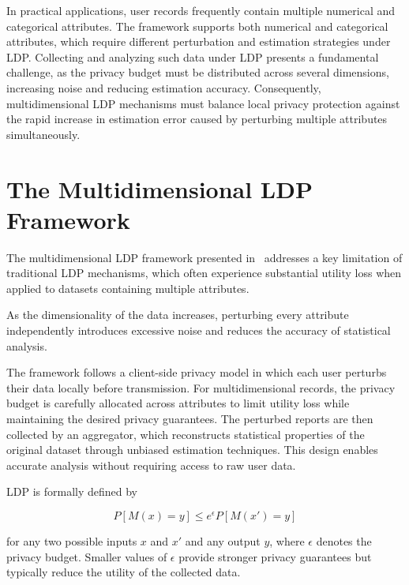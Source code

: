 \documentclass[sigconf]{acmart}
\begin{document}
In practical applications, user records frequently contain multiple numerical and categorical attributes. The framework supports both numerical and categorical attributes, which require different perturbation and estimation strategies under LDP.
 Collecting and analyzing such data under LDP presents a fundamental challenge, as the privacy budget must be distributed across several dimensions, increasing noise and reducing estimation accuracy. Consequently, multidimensional LDP mechanisms must balance local privacy protection against the rapid increase in estimation error caused by perturbing multiple attributes simultaneously.



\section{The Multidimensional LDP Framework}
The multidimensional LDP framework presented in~\cite{wang2019} addresses a key limitation of traditional LDP mechanisms, which often experience substantial utility loss when applied to datasets containing multiple attributes.

 As the dimensionality of the data increases, perturbing every attribute independently introduces excessive noise and reduces the accuracy of statistical analysis.

The framework follows a client-side privacy model in which each user perturbs their data locally before transmission. For multidimensional records, the privacy budget is carefully allocated across attributes to limit utility loss while maintaining the desired privacy guarantees. The perturbed reports are then collected by an aggregator, which reconstructs statistical properties of the original dataset through unbiased estimation techniques. This design enables accurate analysis without requiring access to raw user data.

LDP is formally defined by

\begin{equation}
P[M(x)=y] \leq e^{\epsilon} P[M(x')=y]
\end{equation}

for any two possible inputs $x$ and $x'$ and any output $y$, where $\epsilon$ denotes the privacy budget. Smaller values of $\epsilon$ provide stronger privacy guarantees but typically reduce the utility of the collected data.
\end{document}
